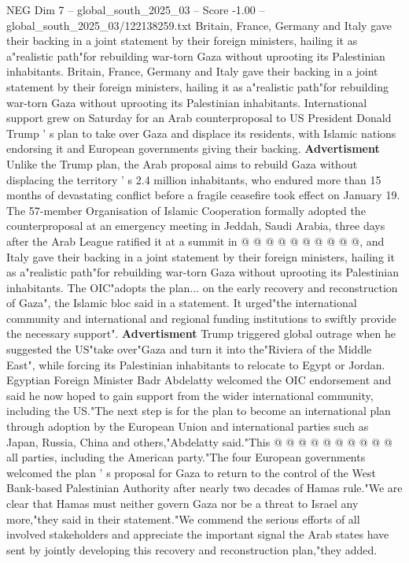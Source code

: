 \begin{textsample}{NEG Dim 7 – global\_south\_2025\_03 – Score -1.00 – global\_south\_2025\_03/122138259.txt}  \label{ex:f7_neg_025}
Britain, France, Germany and Italy gave their backing in a joint statement by their foreign ministers, hailing it as a"realistic path"for rebuilding war-torn Gaza without uprooting its Palestinian inhabitants.
Britain, France, Germany and Italy gave their backing in a joint statement by their foreign ministers, hailing it as a"realistic path"for rebuilding war-torn Gaza without uprooting its Palestinian inhabitants.
International support grew on Saturday for an Arab counterproposal to US President Donald Trump ' s plan to take over Gaza and displace its residents, with Islamic nations endorsing it and European governments giving their backing. \textbf{Advertisment} Unlike the Trump plan, the Arab proposal aims to rebuild Gaza without displacing the territory ' s 2.4 million inhabitants, who endured more than 15 months of devastating conflict before a fragile ceasefire took effect on January 19.
The 57-member Organisation of Islamic Cooperation formally adopted the counterproposal at an emergency meeting in Jeddah, Saudi Arabia, three days after the Arab League ratified it at a summit in @ @ @ @ @ @ @ @ @ @, and Italy gave their backing in a joint statement by their foreign ministers, hailing it as a"realistic path"for rebuilding war-torn Gaza without uprooting its Palestinian inhabitants.
The OIC"adopts the plan... on the early recovery and reconstruction of Gaza", the Islamic bloc said in a statement.
It urged"the international community and international and regional funding institutions to swiftly provide the necessary support". \textbf{Advertisment} Trump triggered global outrage when he suggested the US"take over"Gaza and turn it into the"Riviera of the Middle East", while forcing its Palestinian inhabitants to relocate to Egypt or Jordan.
Egyptian Foreign Minister Badr Abdelatty welcomed the OIC endorsement and said he now hoped to gain support from the wider international community, including the US."The next step is for the plan to become an international plan through adoption by the European Union and international parties such as Japan, Russia, China and others,"Abdelatty said."This @ @ @ @ @ @ @ @ @ @ all parties, including the American party."The four European governments welcomed the plan ' s proposal for Gaza to return to the control of the West Bank-based Palestinian Authority after nearly two decades of Hamas rule."We are clear that Hamas must neither govern Gaza nor be a threat to Israel any more,"they said in their statement."We commend the serious efforts of all involved stakeholders and appreciate the important signal the Arab states have sent by jointly developing this recovery and reconstruction plan,"they added.

\end{textsample}
